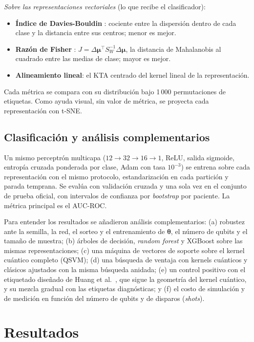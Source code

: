 \documentclass[conference,letterpaper]{IEEEtran}
\begin{document}
\textit{Sobre las representaciones vectoriales} (lo que recibe el clasificador):
\begin{itemize}
  \item \textbf{Índice de Davies-Bouldin} \cite{davies1979cluster}: cociente entre la dispersión dentro de cada clase y la distancia entre sus centros; menor es mejor.
  \item \textbf{Razón de Fisher} \cite{fisher1936use}: $J = \Delta\boldsymbol{\mu}^\top S_W^{-1}\Delta\boldsymbol{\mu}$, la distancia de Mahalanobis al cuadrado entre las medias de clase; mayor es mejor.
  \item \textbf{Alineamiento lineal}: el KTA centrado del kernel lineal de la representación.
\end{itemize}
Cada métrica se compara con su distribución bajo 1\,000 permutaciones de etiquetas. Como ayuda visual, sin valor de métrica, se proyecta cada representación con t-SNE.

\subsection{Clasificación y análisis complementarios}

Un mismo perceptrón multicapa ($12 \to 32 \to 16 \to 1$, ReLU, salida sigmoide, entropía cruzada ponderada por clase, Adam con tasa $10^{-3}$) se entrena sobre cada representación con el mismo protocolo, estandarización en cada partición y parada temprana. Se evalúa con validación cruzada y una sola vez en el conjunto de prueba oficial, con intervalos de confianza por \textit{bootstrap} por paciente. La métrica principal es el AUC-ROC.

Para entender los resultados se añadieron análisis complementarios: (a) robustez ante la semilla, la red, el sorteo y el entrenamiento de $\boldsymbol{\theta}$, el número de qubits y el tamaño de muestra; (b) árboles de decisión, \textit{random forest} y XGBoost sobre las mismas representaciones; (c) una máquina de vectores de soporte sobre el kernel cuántico completo (QSVM); (d) una búsqueda de ventaja con kernels cuánticos y clásicos ajustados con la misma búsqueda anidada; (e) un control positivo con el etiquetado diseñado de Huang et al.~\cite{huang2021power}, que sigue la geometría del kernel cuántico, y su mezcla gradual con las etiquetas diagnósticas; y (f) el costo de simulación y de medición en función del número de qubits y de disparos (\textit{shots}).

\section{Resultados}
\end{document}
